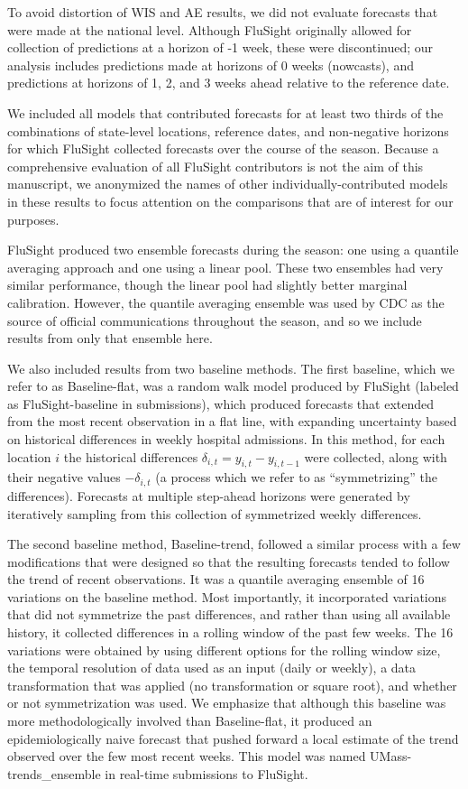 \documentclass{article}\usepackage[]{graphicx}\usepackage[]{xcolor}
\begin{document}
To avoid distortion of WIS and AE results, we did not evaluate forecasts that were made at the national level. Although FluSight originally allowed for collection of predictions at a horizon of -1 week, these were discontinued; our analysis includes predictions made at horizons of 0 weeks (nowcasts), and predictions at horizons of 1, 2, and 3 weeks ahead relative to the reference date.

We included all models that contributed forecasts for at least two thirds of the combinations of state-level locations, reference dates, and non-negative horizons for which FluSight collected forecasts over the course of the season. Because a comprehensive evaluation of all FluSight contributors is not the aim of this manuscript, we anonymized the names of other individually-contributed models in these results to focus attention on the comparisons that are of interest for our purposes.

FluSight produced two ensemble forecasts during the season: one using a quantile averaging approach and one using a linear pool. These two ensembles had very similar performance, though the linear pool had slightly better marginal calibration. However, the quantile averaging ensemble was used by CDC as the source of official communications throughout the season, and so we include results from only that ensemble here.

We also included results from two baseline methods. The first baseline, which we refer to as Baseline-flat, was a random walk model produced by FluSight (labeled as FluSight-baseline in submissions), which produced forecasts that extended from the most recent observation in a flat line, with expanding uncertainty based on historical differences in weekly hospital admissions. In this method, for each location $i$ the historical differences $\delta_{i,t} = y_{i,t} - y_{i,t-1}$ were collected, along with their negative values $-\delta_{i,t}$ (a process which we refer to as ``symmetrizing'' the differences). Forecasts at multiple step-ahead horizons were generated by iteratively sampling from this collection of symmetrized weekly differences.

The second baseline method, Baseline-trend, followed a similar process with a few modifications that were designed so that the resulting forecasts tended to follow the trend of recent observations. It was a quantile averaging ensemble of 16 variations on the baseline method. Most importantly, it incorporated variations that did not symmetrize the past differences, and rather than using all available history, it collected differences in a rolling window of the past few weeks. The 16 variations were obtained by using different options for the rolling window size, the temporal resolution of data used as an input (daily or weekly), a data transformation that was applied (no transformation or square root), and whether or not symmetrization was used. We emphasize that although this baseline was more methodologically involved than Baseline-flat, it produced an epidemiologically naive forecast that pushed forward a local estimate of the trend observed over the few most recent weeks. This model was named UMass-trends\_ensemble in real-time submissions to FluSight.
\end{document}

